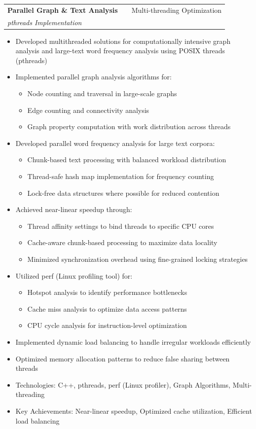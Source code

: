 \documentclass[a4paper,12pt]{article}
\makeatletter
\newenvironment{projectdetailed}[3]
    {
    \begin{tabularx}{\linewidth}{@{}l X r@{}}
    \textbf{#1} & \hfill & #2 \\
    \textit{#3} & & \\[3.75pt]
    \end{tabularx}
    \begin{minipage}[t]{\linewidth}
    \begin{itemize}[nosep,after=\strut, leftmargin=1em, itemsep=2pt,label=--]
    }
    {
    \end{itemize}
    \end{minipage}
    \vspace{6pt}
    }
\makeatother
\begin{document}
\begin{projectdetailed}{Parallel Graph \& Text Analysis}{Multi-threading Optimization}{pthreads Implementation}
\item Developed multithreaded solutions for computationally intensive graph analysis and large-text word frequency analysis using POSIX threads (pthreads)
\item Implemented parallel graph analysis algorithms for:
\begin{itemize}[nosep, leftmargin=2em]
    \item Node counting and traversal in large-scale graphs
    \item Edge counting and connectivity analysis
    \item Graph property computation with work distribution across threads
\end{itemize}
\item Developed parallel word frequency analysis for large text corpora:
\begin{itemize}[nosep, leftmargin=2em]
    \item Chunk-based text processing with balanced workload distribution
    \item Thread-safe hash map implementation for frequency counting
    \item Lock-free data structures where possible for reduced contention
\end{itemize}
\item Achieved near-linear speedup through:
\begin{itemize}[nosep, leftmargin=2em]
    \item Thread affinity settings to bind threads to specific CPU cores
    \item Cache-aware chunk-based processing to maximize data locality
    \item Minimized synchronization overhead using fine-grained locking strategies
\end{itemize}
\item Utilized perf (Linux profiling tool) for:
\begin{itemize}[nosep, leftmargin=2em]
    \item Hotspot analysis to identify performance bottlenecks
    \item Cache miss analysis to optimize data access patterns
    \item CPU cycle analysis for instruction-level optimization
\end{itemize}
\item Implemented dynamic load balancing to handle irregular workloads efficiently
\item Optimized memory allocation patterns to reduce false sharing between threads
\item Technologies: C++, pthreads, perf (Linux profiler), Graph Algorithms, Multi-threading
\item Key Achievements: Near-linear speedup, Optimized cache utilization, Efficient load balancing
\end{projectdetailed}
\end{document}
